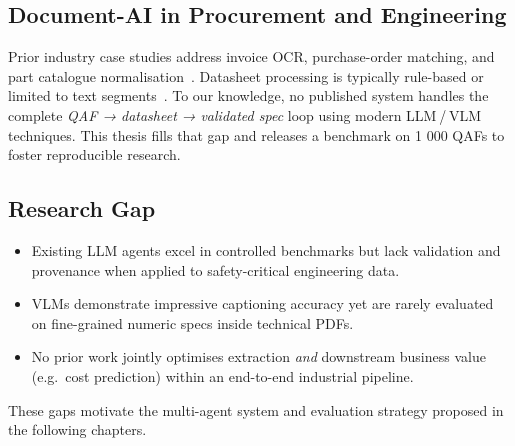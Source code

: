 \subsection{Document-AI in Procurement and Engineering}
Prior industry case studies address invoice OCR, purchase-order matching, and part catalogue normalisation~\cite{chung2020invoiceai, koch2022bom}.  
Datasheet processing is typically rule-based or limited to text segments~\cite{rahman2021datasheet}.  
To our knowledge, no published system handles the complete \emph{QAF → datasheet → validated spec} loop using modern LLM / VLM techniques.  
This thesis fills that gap and releases a benchmark on 1 000 QAFs to foster reproducible research.

\subsection{Research Gap}
\begin{itemize}
  \item Existing LLM agents excel in controlled benchmarks but lack validation and provenance when applied to safety-critical engineering data.
  \item VLMs demonstrate impressive captioning accuracy yet are rarely evaluated on fine-grained numeric specs inside technical PDFs.
  \item No prior work jointly optimises extraction \emph{and} downstream business value (e.g.\ cost prediction) within an end-to-end industrial pipeline.
\end{itemize}
These gaps motivate the multi-agent system and evaluation strategy proposed in the following chapters.
